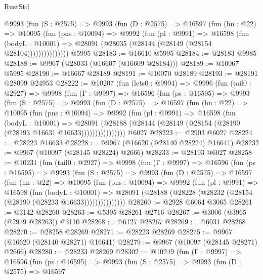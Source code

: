 \begin{lexlean}{RustStd}
\begin{coremodule}
            @9993
              (fun (S : @2575) =>
              @9993
                (fun (D : @2575) =>
                @16597
                  (fun (hn : @22) =>
                  @10095
                    (fun (pns : @10094) =>
                    @9992
                      (fun (pl : @9991) =>
                      @16598
                        (fun (bodyL : @10001) =>
                        @28091 (@28035 (@28144 (@28149 (@28154 @28104)))))))))))))))
    @5995
@28183 := @16610 @5995
@28184 := @28183 @9985
@28188 := @9967 (@28033 (@16607 (@16609 @28184)))
@28189 := @10067 @5995
@28190 := @16667 @28189
@28191 := @10070 @28189
@28193 := @28191 @28099 @24953
@28222 := @10207
    (fun (lets0 : @9994) =>
    @9996
      (fun (tail0 : @2927) =>
      @9998
        (fun (Γ : @9997) =>
        @16596
          (fun (ps : @16595) =>
          @9993
            (fun (S : @2575) =>
            @9993
              (fun (D : @2575) =>
              @16597
                (fun (hn : @22) =>
                @10095
                  (fun (pns : @10094) =>
                  @9992
                    (fun (pl : @9991) =>
                    @16598
                      (fun (bodyL : @10001) =>
                      @28091
                        (@28188
                          (@28144 (@28149 (@28154 (@28190 (@28193 @16631 @16633))))))))))))))))
    @6027
@28223 := @2903 @6027
@28224 := @28223 @16633
@28228 := @9967 (@16620 (@28140 @28224) @16641)
@28232 := @9967 (@10097 (@28145 @28224) @2666)
@28233 := @28193 @6027
@28258 := @10231
    (fun (tail0 : @2927) =>
    @9998
      (fun (Γ : @9997) =>
      @16596
        (fun (ps : @16595) =>
        @9993
          (fun (S : @2575) =>
          @9993
            (fun (D : @2575) =>
            @16597
              (fun (hn : @22) =>
              @10095
                (fun (pns : @10094) =>
                @9992
                  (fun (pl : @9991) =>
                  @16598
                    (fun (bodyL : @10001) =>
                    @28091 (@28188 (@28228 (@28232 (@28154 (@28190 (@28233 @16633)))))))))))))))
@28260 := @2928 @6064 @3065
@28261 := @3142 @28260
@28263 := @5395 @28261 @2716
@28267 := @3006 (@3965 (@2979 @28263)) @3110
@28268 := @6127 @28267
@28269 := @6031 @28268
@28270 := @28258 @28269
@28271 := @28223 @28269
@28275 := @9967 (@16620 (@28140 @28271) @16641)
@28279 := @9967 (@10097 (@28145 @28271) @2666)
@28280 := @28233 @28269
@28302 := @10249
    (fun (Γ : @9997) =>
    @16596
      (fun (ps : @16595) =>
      @9993
        (fun (S : @2575) =>
        @9993
          (fun (D : @2575) =>
          @16597

\end{coremodule}
\end{lexlean}
